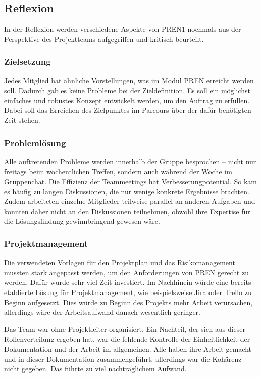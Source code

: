 \documentclass[../main.tex]{subfiles}
\begin{document}
\subsection{Reflexion}
In der Reflexion werden verschiedene Aspekte von PREN1 nochmals aus der Perspektive des Projektteams aufgegriffen und kritisch beurteilt.

\subsubsection{Zielsetzung}
Jedes Mitglied hat ähnliche Vorstellungen, was im Modul PREN erreicht werden soll. Dadurch gab es keine Probleme bei der Zieldefinition. Es soll ein möglichst einfaches und robustes Konzept entwickelt werden, um den Auftrag zu erfüllen. Dabei soll das Erreichen des Zielpunktes im Parcours über der dafür benötigten Zeit stehen.

\subsubsection{Problemlösung}
Alle auftretenden Probleme werden innerhalb der Gruppe besprochen – nicht nur freitags beim wöchentlichen Treffen, sondern auch während der Woche im Gruppenchat. Die Effizienz der Teammeetings hat Verbesserungpotential. So kam es häufig zu langen Diskussionen, die nur wenige konkrete Ergebnisse brachten. Zudem arbeiteten einzelne Mitglieder teilweise parallel an anderen Aufgaben und konnten daher nicht an den Diskussionen teilnehmen, obwohl ihre Expertise für die Lösungsfindung gewinnbringend gewesen wäre.

\subsubsection{Projektmanagement}

Die verwendeten Vorlagen für den Projektplan und das Risikomanagement mussten stark angepasst werden, um den Anforderungen von PREN gerecht zu werden. Dafür wurde sehr viel Zeit investiert. Im Nachhinein würde eine bereits etablierte Lösung für Projektmanagement, wie beispielsweise Jira oder Trello zu Beginn aufgesetzt. Dies würde zu Beginn des Projekts mehr Arbeit verursachen, allerdings wäre der Arbeitsaufwand danach wesentlich geringer.

Das Team war ohne Projektleiter organisiert. Ein Nachteil, der sich aus dieser Rollenverteilung ergeben hat, war die fehlende Kontrolle der Einheitlichkeit der Dokumentation und der Arbeit im allgemeinen. Alle haben ihre Arbeit gemacht und in dieser Dokumentation zusammengeführt, allerdings war die Kohärenz nicht gegeben. Das führte zu viel nachträglichem Aufwand.
\end{document}
